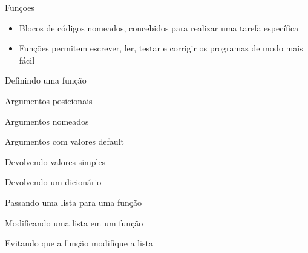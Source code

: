 \begin{frame}[t, fragile]{Funçoes}
  \begin{itemize}
      \item Blocos de códigos nomeados, concebidos para realizar uma tarefa específica
      \item Funções permitem escrever, ler, testar e corrigir os programas de modo mais fácil
  \end{itemize}  
\end{frame}
%
\begin{frame}[t, fragile]{Definindo uma função}
  
\end{frame}
%
\begin{frame}[t, fragile]{Argumentos posicionais}
  
\end{frame}
%
\begin{frame}[t, fragile]{Argumentos nomeados}
  
\end{frame}
%
\begin{frame}[t, fragile]{Argumentos com valores default}
  
\end{frame}
%
\begin{frame}[t, fragile]{Devolvendo valores simples}
  
\end{frame}
%
\begin{frame}[t, fragile]{Devolvendo um dicionário}
  
\end{frame}
%
\begin{frame}[t, fragile]{Passando uma lista para uma função}
  
\end{frame}
%
\begin{frame}{Modificando uma lista em um função}
  
\end{frame}
%
\begin{frame}{Evitando que a função modifique a lista}
  
\end{frame}
%
